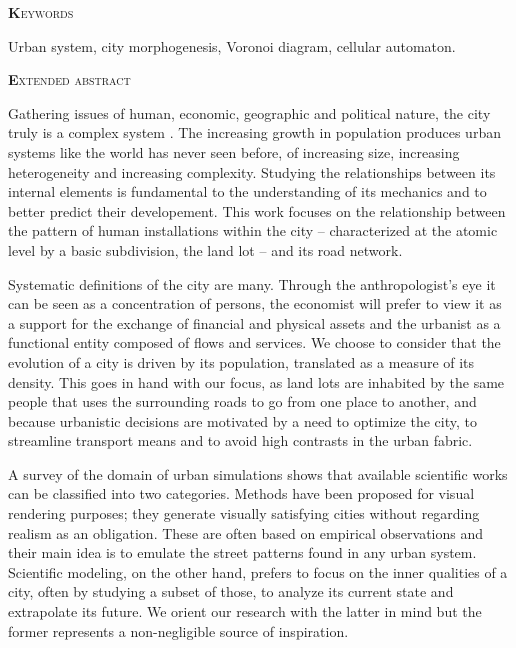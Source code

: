 \documentclass[10pt]{article}
\begin{document}
\begin{center}
  {\scshape\textbf Keywords}
\end{center}

{Urban system, city morphogenesis, Voronoi diagram, cellular automaton.}

\begin{center}
  {\scshape\textbf Extended abstract}
\end{center}

Gathering issues of human, economic, geographic and political nature,
the city truly is a complex system \cite{Batty2011}. The increasing
growth in population produces urban systems like the world has never
seen before, of increasing size, increasing heterogeneity and
increasing complexity. Studying the relationships between its internal
elements is fundamental to the understanding of its mechanics and to
better predict their developement. This work focuses on the
relationship between the pattern of human installations within the
city -- characterized at the atomic level by a basic subdivision, the
land lot -- and its road network.

Systematic definitions of the city are many. Through the
anthropologist's eye it can be seen as a concentration of persons, the
economist will prefer to view it as a support for the exchange of
financial and physical assets and the urbanist as a functional entity
composed of flows and services. We choose to consider that the
evolution of a city is driven by its population, translated as a
measure of its density. This goes in hand with our focus, as land lots
are inhabited by the same people that uses the surrounding roads to go
from one place to another, and because urbanistic decisions are
motivated by a need to optimize the city, to streamline transport
means and to avoid high contrasts in the urban fabric.

A survey of the domain of urban simulations shows that available
scientific works can be classified into two categories. Methods have
been proposed for visual rendering purposes; they generate visually
satisfying cities without regarding realism as an obligation. These
are often based on empirical observations and their main idea is to
emulate the street patterns found in any urban system. Scientific
modeling, on the other hand, prefers to focus on the inner qualities
of a city, often by studying a subset of those, to analyze its current
state and extrapolate its future. We orient our research with the
latter in mind but the former represents a non-negligible source of
inspiration.
\end{document}
